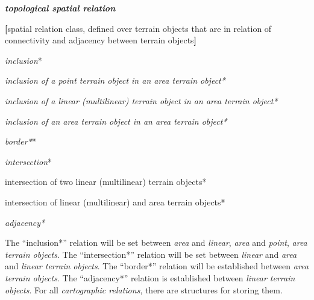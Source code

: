 \documentclass{article}
\begin{document}
\begin{multicols}{2}
    \noindent \textit{\textbf{topological spatial relation}}
    \vspace{-0.3cm}
    \begin{description}[leftmargin=!, labelwidth=1cm, itemsep=-1.5mm]
        \item[$\coloneqq$] \textbf{[}spatial relation class, defined over terrain objects that are in relation of connectivity and adjacency between terrain objects\textbf{]}
        \item[$\ni$] \textit{inclusion}*
        \vspace{-0.3cm}
        \begin{description}[leftmargin=!, labelwidth=1cm, itemsep=-1.5mm]
            \item[$\supset$] \textit{inclusion of a point terrain object in an area terrain object*}
            \item[$\supset$] \textit{inclusion of a linear (multilinear) terrain object in an area terrain object*}
            \item[$\supset$] \textit{inclusion of an area terrain object in an area terrain object*}
        \end{description}
        \item[$\ni$] \textit{border*}*
        \item[$\ni$] \textit{intersection}*
        \vspace{-0.3cm}
        \begin{description}[leftmargin=!, labelwidth=1cm, itemsep=-1.5mm]
            \item[$\supset$] intersection of two linear (multilinear) terrain objects*
            \item[$\supset$] intersection of linear (multilinear) and area terrain objects*
        \end{description}
        \item[$\supset$] \textit{adjacency*}
    \end{description}

    The “inclusion*” relation will be set between \textit{area} and \textit{linear}, \textit{area} and \textit{point}, \textit{area terrain objects}. The “intersection*” relation will be set between \textit{linear} and \textit{area} and \textit{linear terrain objects}. The “border*” relation will be established between \textit{area terrain objects}. The “adjacency*” relation is established between \textit{linear terrain objects}. For all \textit{cartographic relations}, there are structures for storing them.


\end{multicols}
\end{document}
